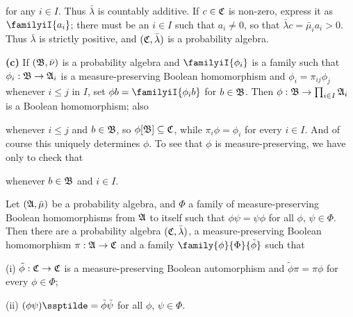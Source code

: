 {\noindent for any $i\in I$.   Thus $\bar\lambda$ is countably additive.
If $c\in\frak C$ is non-zero, express it as $\familyiI{a_i}$;  there must
be an $i\in I$ such that $a_i\ne 0$, so that
$\bar\lambda c=\bar\mu_ia_i>0$.   Thus $\bar\lambda$ is strictly positive,
and $(\frak C,\bar\lambda)$ is a probability algebra.

\medskip

{\bf (c)} If $(\frak B,\bar\nu)$ is a probability algebra and
$\familyiI{\phi_i}$ is a family such that $\phi_i:\frak B\to\frak A_i$ is a
measure-preserving Boolean homomorphism and $\phi_i=\pi_{ij}\phi_j$
whenever $i\le j$ in $I$, set $\phi b=\familyiI{\phi_ib}$ for
$b\in\frak B$.   Then $\phi:\frak B\to\prod_{i\in I}\frak A_i$ is a Boolean
homomorphism;  also


\noindent whenever $i\le j$ and $b\in\frak B$, so
$\phi[\frak B]\subseteq\frak C$, while $\pi_i\phi=\phi_i$ for every
$i\in I$.   And of course this uniquely determines $\phi$.   To see that
$\phi$ is measure-preserving, we have only to check that


\noindent whenever $b\in\frak B$ and $i\in I$.
}%

 Let $(\frak A,\bar\mu)$ be a probability
algebra, and $\Phi$
a family of measure-preserving Boolean homomorphisms from $\frak A$ to
itself such that $\phi\psi=\psi\phi$ for all $\phi$, $\psi\in\Phi$.   Then
there are a probability algebra $(\frak C,\bar\lambda)$, a
measure-preserving Boolean homomorphism $\pi:\frak A\to\frak C$
and a family $\family{\phi}{\Phi}{\tilde\phi}$ such that

(i) $\tilde\phi:\frak C\to\frak C$ is a measure-preserving Boolean
automorphism and $\tilde\phi\pi=\pi\phi$ for every $\phi\in\Phi$;

(ii) $(\phi\psi)\ssptilde=\tilde\phi\tilde\psi$ for all $\phi$,
$\psi\in\Phi$.

